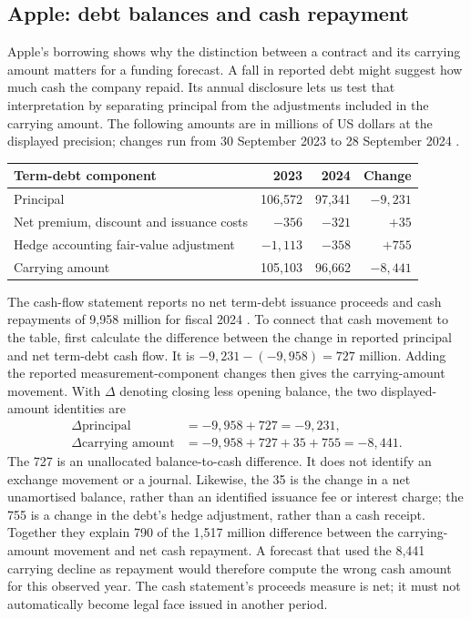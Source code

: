 \subsection{Apple: debt balances and cash repayment}

Apple's borrowing shows why the distinction between a contract and its carrying
amount matters for a funding forecast. A fall in reported debt might suggest
how much cash the company repaid. Its annual disclosure lets us test that
interpretation by separating principal from the adjustments included in the
carrying amount. The following amounts are in millions of US dollars at the
displayed precision; changes run from 30 September 2023 to 28 September 2024
\citep[Note 9, printed pp.~43--44]{apple2024}.

\begin{center}
\begin{tabular}{lrrr}
\toprule
Term-debt component & 2023 & 2024 & Change\\\midrule
Principal &106,572&97,341&$-9,231$\\
Net premium, discount and issuance costs &$-356$&$-321$&$+35$\\
Hedge accounting fair-value adjustment &$-1,113$&$-358$&$+755$\\\midrule
Carrying amount &105,103&96,662&$-8,441$\\\bottomrule
\end{tabular}
\end{center}

The cash-flow statement reports no net term-debt issuance proceeds and cash
repayments of 9,958 million for fiscal 2024 \citep[printed p.~33]{apple2024}.
To connect that cash movement to the table, first calculate the difference
between the change in reported principal and net term-debt cash flow. It is
$-9{,}231-(-9{,}958)=727$ million. Adding the reported measurement-component
changes then gives the carrying-amount movement. With $\Delta$ denoting closing
less opening balance, the two displayed-amount identities are
\[
\begin{aligned}
 \Delta\text{principal}
   &=-9{,}958+727=-9{,}231,\\
 \Delta\text{carrying amount}
   &=-9{,}958+727+35+755=-8{,}441.
\end{aligned}
\]
The 727 is an unallocated balance-to-cash difference. It does not identify an
exchange movement or a journal. Likewise, the 35 is the change in a net
unamortised balance, rather than an identified issuance fee or interest charge;
the 755 is a change in the debt's hedge adjustment, rather than a cash receipt.
Together they explain 790 of the 1,517 million difference between the
carrying-amount movement and net cash repayment. A forecast that used the
8,441 carrying decline as repayment would therefore compute the wrong cash
amount for this observed year. The cash statement's proceeds measure is net;
it must not automatically become legal face issued in another period.

